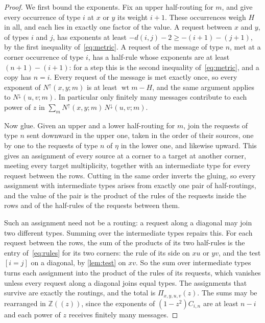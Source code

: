 \documentclass[11pt]{article}
\theoremstyle{definition}
\theoremstyle{definition}
\theoremstyle{remark}
\newcommand{\Z}{\mathbb{Z}}
\newcommand{\wt}{\operatorname{wt}}
\newcommand{\Nup}{N^{\uparrow}}
\newcommand{\Ndown}{N^{\downarrow}}
\begin{document}
\begin{proof}
We first bound the exponents. Fix an upper half-routing for $m$, and give every occurrence of type $i$ at $x$ or $y$ its weight $i+1$. These occurrences weigh $H$ in all, and each lies in exactly one factor of the value. A request between $x$ and $y$, of types $i$ and $j$, has exponents at least $-d(i,j)-2\ge-(i+1)-(j+1)$, by the first inequality of~\eqref{eq:metric}. A request of the message of type $n$, met at a corner occurrence of type $i$, has a half-rule whose exponents are at least $(n+1)-(i+1)$: for a step this is the second inequality of~\eqref{eq:metric}, and a copy has $n=i$. Every request of the message is met exactly once, so every exponent of $\Nup(x,y;m)$ is at least $\wt m-H$, and the same argument applies to $\Ndown(u,v;m)$. In particular only finitely many messages contribute to each power of $z$ in $\sum_m\Nup(x,y;m)\,\Ndown(u,v;m)$.

Now glue. Given an upper and a lower half-routing for $m$, join the requests of type $n$ sent downward in the upper one, taken in the order of their sources, one by one to the requests of type $n$ of $\eta$ in the lower one, and likewise upward. This gives an assignment of every source at a corner to a target at another corner, meeting every target multiplicity, together with an intermediate type for every request between the rows. Cutting in the same order inverts the gluing, so every assignment with intermediate types arises from exactly one pair of half-routings, and the value of the pair is the product of the rules of the requests inside the rows and of the half-rules of the requests between them.

Such an assignment need not be a routing: a request along a diagonal may join two different types. Summing over the intermediate types repairs this. For each request between the rows, the sum of the products of its two half-rules is the entry of~\eqref{eq:rules} for its two corners: the rule of its side on $xu$ or $yv$, and the test $[i=j]$ on a diagonal, by \cref{lem:test} on $xv$. So the sum over intermediate types turns each assignment into the product of the rules of its requests, which vanishes unless every request along a diagonal joins equal types. The assignments that survive are exactly the routings, and the total is $\Pi_{x,y,u,v}(z)$. The sums may be rearranged in $\Z((z))$, since the exponents of $(1-z^2)C_{i,n}$ are at least $n-i$ and each power of $z$ receives finitely many messages.
\end{proof}
\end{document}
